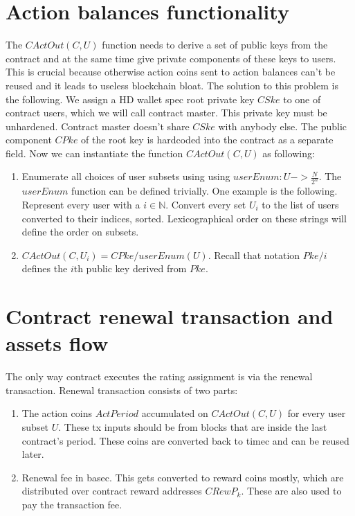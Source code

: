\documentclass[]{itmo-student-thesis}
\begin{document}
\section{Action balances functionality}

The $CActOut(C, U)$ function needs to derive a set of public keys from
the contract and at the same time give private components of these
keys to users. This is crucial because otherwise action coins sent to
action balances can’t be reused and it leads to useless blockchain
bloat. The solution to this problem is the following. We assign a HD
wallet spec root private key $CSke$ to one of contract users, which we
will call contract master. This private key must be
unhardened. Contract master doesn’t share $CSke$ with anybody
else. The public component $CPke$ of the root key is hardcoded into
the contract as a separate field. Now we can instantiate the function
$CActOut(C,U)$ as following:

\begin{enumerate}

\item Enumerate all choices of user subsets using using $userEnum : U
  -> \frac{N}{2^n}$. The $userEnum$ function can be defined trivially. One
  example is the following. Represent every user with a $i \in
  \mathbb{N}$. Convert every set $U_i$ to the list of users converted to their
  indices, sorted. Lexicographical order on these strings will define
  the order on subsets.

\item $CActOut(C,U_i) = CPke/userEnum(U)$. Recall that notation
  $Pke/i$ defines the $i$th public key derived from $Pke$.
\end{enumerate}

\section{Contract renewal transaction and assets flow}

The only way contract executes the rating assignment is via the
renewal transaction. Renewal transaction consists of two parts:

\begin{enumerate}
\item The action coins $ActPeriod$ accumulated on $CActOut(C,U)$ for
  every user subset $U$. These tx inputs should be from blocks that
  are inside the last contract’s period. These coins are converted
  back to timec and can be reused later.
\item Renewal fee in basec. This gets converted to reward coins
  mostly, which are distributed over contract reward addresses
  ${CRewP_k}$. These are also used to pay the transaction fee.
\end{enumerate}
\end{document}
